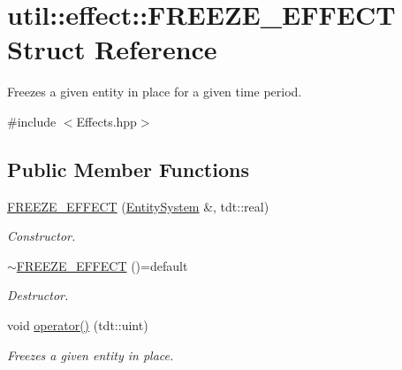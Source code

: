 \hypertarget{structutil_1_1effect_1_1_f_r_e_e_z_e___e_f_f_e_c_t}{}\section{util\+:\+:effect\+:\+:F\+R\+E\+E\+Z\+E\+\_\+\+E\+F\+F\+E\+CT Struct Reference}
\label{structutil_1_1effect_1_1_f_r_e_e_z_e___e_f_f_e_c_t}


Freezes a given entity in place for a given time period.  




{\ttfamily \#include $<$Effects.\+hpp$>$}

\subsection*{Public Member Functions}
\begin{DoxyCompactItemize}
\item 
\hyperlink{structutil_1_1effect_1_1_f_r_e_e_z_e___e_f_f_e_c_t_aca7fba095c1647b74d818ff73696c8b9}{F\+R\+E\+E\+Z\+E\+\_\+\+E\+F\+F\+E\+CT} (\hyperlink{class_entity_system}{Entity\+System} \&, tdt\+::real)
\begin{DoxyCompactList}\small\item\em Constructor. \end{DoxyCompactList}\item 
\hyperlink{structutil_1_1effect_1_1_f_r_e_e_z_e___e_f_f_e_c_t_a1434b6ee911b6586e8466fa0aa6fc0e0}{$\sim$\+F\+R\+E\+E\+Z\+E\+\_\+\+E\+F\+F\+E\+CT} ()=default
\begin{DoxyCompactList}\small\item\em Destructor. \end{DoxyCompactList}\item 
void \hyperlink{structutil_1_1effect_1_1_f_r_e_e_z_e___e_f_f_e_c_t_aa5bc5da43f7d9e15b84bc9b482524b16}{operator()} (tdt\+::uint)
\begin{DoxyCompactList}\small\item\em Freezes a given entity in place. \end{DoxyCompactList}\end{DoxyCompactItemize}
